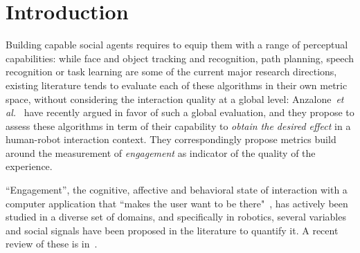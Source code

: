 \documentclass{sig-alternate}
\newcommand{\etal}{\textit{et al.}\xspace}
\begin{document}

\section{Introduction}

%

Building capable social agents requires to equip them with a range
of perceptual capabilities: while face and object tracking and
recognition, path planning, speech recognition or task learning are some of the current major research
directions, existing literature tends to evaluate each of these algorithms in
their own metric space, without considering the interaction quality at a global
level: Anzalone~\etal~\cite{anzalone} have recently argued in favor of
such a global evaluation, and they propose to assess these algorithms in term of
their capability to \emph{obtain the desired effect} in a human-robot interaction
context. They correspondingly propose metrics build around the measurement
of \emph{engagement} as indicator of the quality of the experience.

``Engagement'', the cognitive, affective and behavioral state of interaction
with a computer application that ``makes the user want to be
there"~\cite{OBrien:2010}, has actively been studied in a diverse set of
domains, and specifically in robotics, several variables and social signals have been proposed in the
literature to quantify it. A recent review of these is in~\cite{ivaldi2015towards}.
\end{document}
